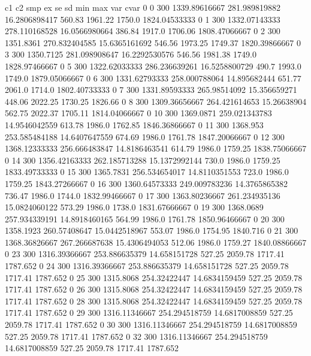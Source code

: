 c1 c2 smp ex se sd  min max var cvar
0  0  300  1339.89616667  281.989819882  16.2806898417  560.83  1961.22  1750.0  1824.04533333 
0  1  300  1332.07143333  278.110168528  16.0566980664  386.84  1917.0  1706.06  1808.47066667 
0  2  300  1351.8361  270.832404585  15.6365161692  546.56  1973.25  1749.37  1820.39866667 
0  3  300  1350.7125  281.098908647  16.2292530576  546.56  1981.38  1749.0  1828.97466667 
0  5  300  1322.62033333  286.236639261  16.5258800729  490.7  1993.0  1749.0  1879.05066667 
0  6  300  1331.62793333  258.000788064  14.895682444  651.77  2061.0  1714.0  1802.40733333 
0  7  300  1331.89593333  265.98514092  15.356659271  448.06  2022.25  1730.25  1826.66 
0  8  300  1309.36656667  264.421614653  15.26638904  562.75  2022.37  1705.11  1814.04066667 
0  10  300  1369.0871  259.021343783  14.9546042559  613.78  1986.0  1762.85  1846.36866667 
0  11  300  1368.953  253.585484188  14.6407647559  674.69  1986.0  1761.78  1847.20066667 
0  12  300  1368.12333333  256.666483847  14.8186463541  614.79  1986.0  1759.25  1838.75066667 
0  14  300  1356.42163333  262.185713288  15.1372992144  730.0  1986.0  1759.25  1833.49733333 
0  15  300  1365.7831  256.534654017  14.8110351553  723.0  1986.0  1759.25  1843.27266667 
0  16  300  1360.64573333  249.009783236  14.3765865382  736.47  1986.0  1744.0  1832.99466667 
0  17  300  1363.80236667  261.234935136  15.0824060122  573.29  1986.0  1738.0  1831.67666667 
0  19  300  1368.0689  257.934339191  14.8918460165  564.99  1986.0  1761.78  1850.96466667 
0  20  300  1358.1923  260.57408647  15.0442518967  553.07  1986.0  1754.95  1840.716 
0  21  300  1368.36826667  267.266687638  15.4306494053  512.06  1986.0  1759.27  1840.08866667 
0  23  300  1316.39366667  253.886635379  14.658151728  527.25  2059.78  1717.41  1787.652 
0  24  300  1316.39366667  253.886635379  14.658151728  527.25  2059.78  1717.41  1787.652 
0  25  300  1315.8068  254.32422447  14.6834159459  527.25  2059.78  1717.41  1787.652 
0  26  300  1315.8068  254.32422447  14.6834159459  527.25  2059.78  1717.41  1787.652 
0  28  300  1315.8068  254.32422447  14.6834159459  527.25  2059.78  1717.41  1787.652 
0  29  300  1316.11346667  254.294518759  14.6817008859  527.25  2059.78  1717.41  1787.652 
0  30  300  1316.11346667  254.294518759  14.6817008859  527.25  2059.78  1717.41  1787.652 
0  32  300  1316.11346667  254.294518759  14.6817008859  527.25  2059.78  1717.41  1787.652 

